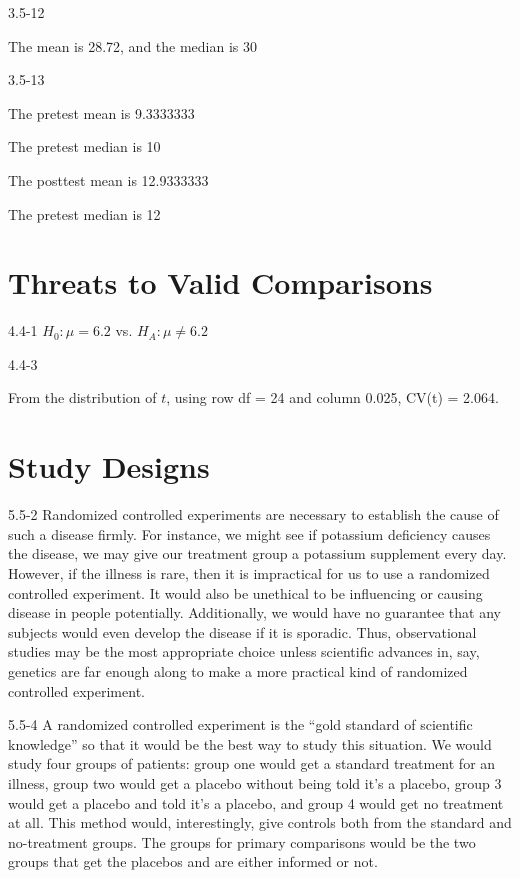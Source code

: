 \begin{exsol@solution}{3.5-12}


  The mean is 28.72, and the median is 30

\end{exsol@solution}
\begin{exsol@solution}{3.5-13}



	The pretest mean is  9.3333333


	The pretest median is 10


	The posttest mean is	12.9333333


The pretest median is 12

\end{exsol@solution}
\setcounter{chapter}{3}\chapter{Threats to Valid Comparisons}
\begin{exsol@solution}{4.4-1}
	  $H_0: \mu = 6.2$ vs. $H_A: \mu \neq 6.2$
\end{exsol@solution}
\begin{exsol@solution}{4.4-3}

    From the distribution of $t$, using row df = 24 and column 0.025, CV(t) = 2.064.
\end{exsol@solution}
\setcounter{chapter}{4}\chapter{Study Designs}
\begin{exsol@solution}{5.5-2}
Randomized controlled experiments are necessary to establish the cause of such a disease firmly. For instance, we might see if potassium deficiency causes the disease, we may give our treatment group a potassium supplement every day. However, if the illness is rare, then it is impractical for us to use a randomized controlled experiment.  It would also be unethical to be influencing or causing disease in people potentially.  Additionally, we would have no guarantee that any subjects would even develop the disease if it is sporadic. Thus, observational studies may be the most appropriate choice unless scientific advances in, say, genetics are far enough along to make a more practical kind of randomized controlled experiment.
	
\end{exsol@solution}
\begin{exsol@solution}{5.5-4}
A randomized controlled experiment is the ``gold standard of scientific knowledge'' so that it would be the best way to study this situation. We would study four groups of patients: group one would get a standard treatment for an illness, group two would get a placebo without being told it's a placebo, group 3 would get a placebo and told it's a placebo, and group 4 would get no treatment at all. This method would, interestingly, give controls both from the standard and no-treatment groups. The groups for primary comparisons would be the two groups that get the placebos and are either informed or not.

\end{exsol@solution}
